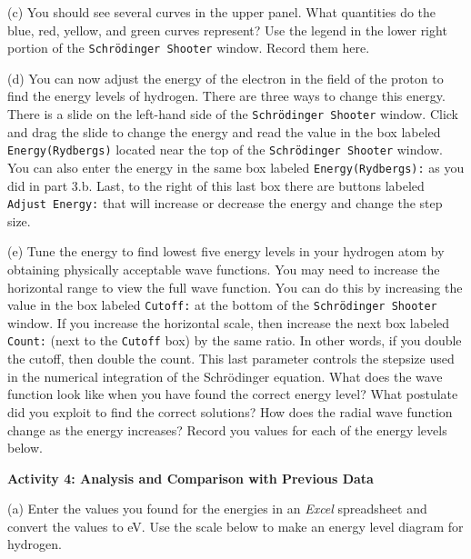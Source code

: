 (c) You should see several curves in the upper panel.
What quantities do the blue, red, yellow, and green curves represent?
Use the legend in the lower right portion of the {\tt Schr\"odinger Shooter}
window.
Record them here.
\vspace{2.5cm}

(d) You can now adjust the energy of the electron in the field of the proton to find 
the energy levels of hydrogen.
There are three ways to change this energy.
There is a slide on the left-hand side of the {\tt Schr\"odinger Shooter} window.
Click and drag the slide to change the energy and read the value
in the box labeled {\tt Energy(Rydbergs)} located near the top of the 
{\tt Schr\"odinger Shooter} window.
You can also enter the energy in the same box
labeled {\tt Energy(Rydbergs):} as you did in part 3.b.
Last, to the right of this last box there are buttons labeled
{\tt Adjust Energy:} that will increase or decrease the energy and change the step size.

(e) Tune the energy to find lowest five energy levels in your hydrogen atom by obtaining
physically acceptable wave functions.
You may need to increase the horizontal range to view the full wave function.
You can do this by increasing the value in the box labeled {\tt Cutoff:} at the
bottom of the {\tt Schr\"odinger Shooter} window.
If you increase the horizontal scale, then increase the next box labeled
{\tt Count:} (next to the {\tt Cutoff} box) by the same ratio.
In other words, if you double the cutoff, then double the count.
This last parameter controls the stepsize used in the numerical integration of
the Schr\"odinger equation.
What does the wave function look like when you have found the correct energy level?
What postulate did you exploit to find the correct solutions?
How does the radial wave function change as the energy increases?
Record you values for each of the energy levels below.
\vspace{5.0cm}

\textbf{Activity 4: Analysis and Comparison with Previous Data}

(a) Enter the values you found for the energies in an {\it Excel} spreadsheet
and convert the values to eV.
Use the scale below to make an energy level diagram for hydrogen.

\vspace{0.25in}

